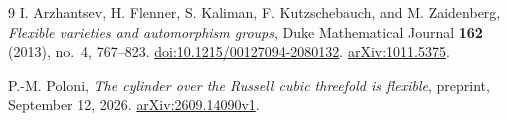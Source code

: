 \documentclass[11pt,letterpaper]{article}
\theoremstyle{remark}
\begin{document}
\begin{thebibliography}{9}
I. Arzhantsev, H. Flenner, S. Kaliman, F. Kutzschebauch, and M. Zaidenberg,
\emph{Flexible varieties and automorphism groups},
Duke Mathematical Journal \textbf{162} (2013), no.~4, 767--823.
\href{https://doi.org/10.1215/00127094-2080132}{doi:10.1215/00127094-2080132}.
\href{https://arxiv.org/abs/1011.5375}{arXiv:1011.5375}.

P.-M. Poloni,
\emph{The cylinder over the Russell cubic threefold is flexible},
preprint, September 12, 2026.
\href{https://arxiv.org/abs/2609.14090v1}{arXiv:2609.14090v1}.
\end{thebibliography}
\end{document}
